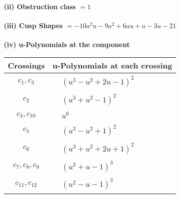 \documentclass[1p]{elsarticle_modified}
\theoremstyle{definition}
\begin{document}
\flushleft \textbf{(ii) Obstruction class $= 1$}\\~\\
\flushleft \textbf{(iii) Cusp Shapes $= -10 a^2 u-9 a^2+6 a u+a-3 u-21$}\\~\\
\newpage\renewcommand{\arraystretch}{1}
\flushleft \textbf{(iv) u-Polynomials at the component}\newline \\
\begin{tabular}{m{50pt}|m{274pt}}
Crossings & \hspace{64pt}u-Polynomials at each crossing \\
\hline $$\begin{aligned}c_{1},c_{3}\end{aligned}$$&$\begin{aligned}
&(u^3- u^2+2 u-1)^2
\end{aligned}$\\
\hline $$\begin{aligned}c_{2}\end{aligned}$$&$\begin{aligned}
&(u^3+u^2-1)^2
\end{aligned}$\\
\hline $$\begin{aligned}c_{4},c_{10}\end{aligned}$$&$\begin{aligned}
&u^6
\end{aligned}$\\
\hline $$\begin{aligned}c_{5}\end{aligned}$$&$\begin{aligned}
&(u^3- u^2+1)^2
\end{aligned}$\\
\hline $$\begin{aligned}c_{6}\end{aligned}$$&$\begin{aligned}
&(u^3+u^2+2 u+1)^2
\end{aligned}$\\
\hline $$\begin{aligned}c_{7},c_{8},c_{9}\end{aligned}$$&$\begin{aligned}
&(u^2+u-1)^3
\end{aligned}$\\
\hline $$\begin{aligned}c_{11},c_{12}\end{aligned}$$&$\begin{aligned}
&(u^2- u-1)^3
\end{aligned}$\\
\hline
\end{tabular}\\~\\
\end{document}
